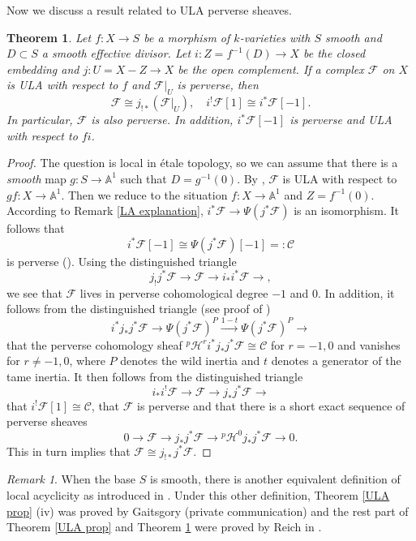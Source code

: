 \documentclass[]{pcmi}
\theoremstyle{plain}
\newtheorem{thm}[equation]{Theorem}
\theoremstyle{remark}
\newtheorem{rmk}[equation]{Remark}
\theoremstyle{definition}
\newcommand{\bA}{{\mathbb A}}
\newcommand{\mC}{{\mathcal C}}
\newcommand{\mF}{{\mathcal F}}
\newcommand{\mH}{{\mathcal H}}
\begin{document}
Now we discuss a result related to ULA perverse sheaves. 
\begin{thm}\label{ULA perverse}
Let $f: X\to S$ be a morphism of $k$-varieties with $S$ smooth and $D\subset S$ a smooth effective divisor. Let $i: Z=f^{-1}(D)\to X$ be the closed embedding and $j:U=X-Z\to X$ be the open complement. If a complex $\mF$ on $X$ is ULA with respect to $f$ and $\mF|_U$ is perverse, then 
\[\mF\cong j_{!*}(\mF|_U), \quad i^!\mF[1]\cong i^*\mF[-1].\]
In particular, $\mF$ is also perverse. In addition, $i^*\mF[-1]$ is perverse and ULA with respect to $fi$. 
\end{thm}
\begin{proof} The question is local in \'etale topology, so we can assume that there is a \emph{smooth} map $g: S\to \bA^1$ such that $D=g^{-1}(0)$. By \cite[Lemma 2.14]{SGA4.5}, $\mF$ is ULA with respect to $gf: X\to \bA^1$.
Then we reduce to the situation $f:X\to \bA^1$ and $Z=f^{-1}(0)$. According to Remark \ref{LA explanation}, $i^*\mF\to \Psi(j^*\mF)$ is an isomorphism. It follows that
\[i^*\mF[-1]\cong \Psi(j^*\mF)[-1]=:\mC\]
is perverse (\cite[Corollary 4.5]{Il2}). Using the distinguished triangle
\[ j_!j^*\mF\to \mF\to i_*i^*\mF\to,\]
we see that $\mF$ lives in perverse cohomological degree $-1$ and $0$.
In addition,  it follows from the distinguished triangle (see proof of \cite[Lemma 3.11]{SGA4.5})
\[i^*j_*j^*\mF\to \Psi(j^*\mF)^P\stackrel{1-t}{\to} \Psi(j^*\mF)^P\to\]
that the perverse cohomology sheaf ${^p}\mH^r i^*j_*j^*\mF\cong \mC$ for $r=-1,0$ and vanishes for $r\neq -1,0$, where $P$ denotes the wild inertia and $t$ denotes a generator of the tame inertia.
It then follows from the distinguished triangle 
$$i_*i^!\mF\to \mF\to j_*j^*\mF\to $$ that $i^!\mF[1]\cong \mC$, that $\mF$ is perverse and that there is a short exact sequence of perverse sheaves
$$0\to \mF\to j_*j^*\mF\to {^p}\mH^0j_*j^*\mF\to 0.$$ 
This in turn implies that $\mF\cong j_{!*}j^*\mF$.
\end{proof}


\begin{rmk}
When the base $S$ is smooth, there is another equivalent definition of local acyclicity as introduced in \cite[\S~5.1,~Appendix B]{BGa}. Under this other definition, Theorem \ref{ULA prop} (iv) was proved by Gaitsgory (private communication) and the rest part of Theorem \ref{ULA prop} and Theorem \ref{ULA perverse} were proved by Reich in \cite{Rei}.
\end{rmk}
\end{document}
